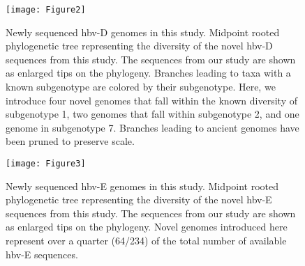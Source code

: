 \begin{figure}[ht]
  \centering
  \texttt{[image: Figure2]}
  \caption[HBV-D new sequences]{Newly sequenced \gls{hbv}-D genomes in this study. Midpoint rooted phylogenetic tree representing the diversity of the novel \gls{hbv}-D sequences from this study. The sequences from our study are shown as enlarged tips on the phylogeny. Branches leading to taxa with a known subgenotype are colored by their subgenotype. Here, we introduce four novel genomes that fall within the known diversity of subgenotype 1, two genomes that fall within subgenotype 2, and one genome in subgenotype 7. Branches leading to ancient genomes have been pruned to preserve  scale.}
  \label{fig:3-2}
\end{figure}

\begin{figure}[ht]
  \centering
  \texttt{[image: Figure3]}
  \caption[HBV-E new sequences]{Newly sequenced \gls{hbv}-E genomes in this study. Midpoint rooted phylogenetic tree representing the diversity of the novel \gls{hbv}-E sequences from this study. The sequences from our study are shown as enlarged tips on the phylogeny. Novel genomes introduced here represent over a quarter (64/234) of the total number of available \gls{hbv}-E sequences.}
  \label{fig:3-3}
\end{figure}

